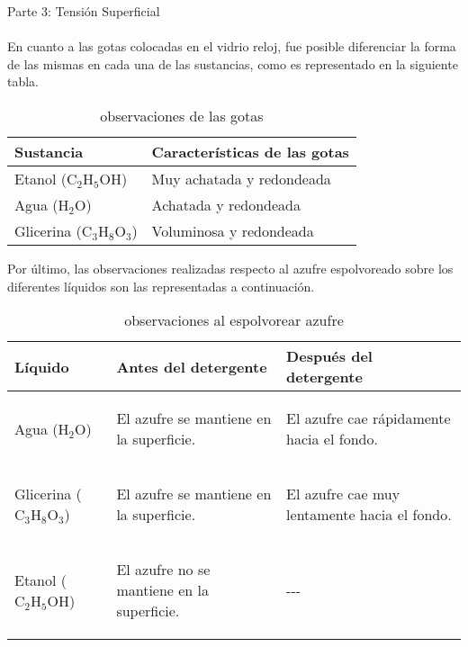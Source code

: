 \documentclass{article}
\begin{document}
Parte 3: Tensión Superficial
\\
\\
En cuanto a las gotas colocadas en el vidrio reloj, fue posible diferenciar la forma de las mismas en cada una de las sustancias, como es representado en la siguiente tabla.
\begin{table}[H]
\centering
\begin{tabular}{|m{4.5cm}|m{7.1cm}|}
\hline
\rowcolor[HTML]{C0C0C0} 
Sustancia & Características de las gotas \\ \hline
Etanol ($\text{C}_{\text{2}}\text{H}_{\text{5}}\text{OH}$) & Muy achatada y redondeada \\ \hline
Agua ($\text{H}_{\text{2}}\text{O}$) & Achatada y redondeada \\ \hline
Glicerina ($\text{C}_{\text{3}}\text{H}_{\text{8}}\text{O}_{\text{3}}$) & Voluminosa y redondeada \\ \hline
\end{tabular}
\caption{observaciones de las gotas}
\label{gota}
\end{table}
\newpage
Por último, las observaciones realizadas respecto al azufre espolvoreado sobre los diferentes líquidos son las representadas a continuación.

\begin{table}[H]
\centering
\begin{tabular}{|m{3.4cm}|m{3.9cm}|m{3.9cm}|}
\hline
\rowcolor[HTML]{C0C0C0} 
Líquido & Antes del detergente & Después del detergente \\ \hline
Agua ($\text{H}_{\text{2}}\text{O}$) & El azufre se mantiene en la superficie. & \begin{flushleft}El azufre cae rápidamente hacia el fondo.\end{flushleft} \\ \hline
Glicerina ($\text{C}_{\text{3}}\text{H}_{\text{8}}\text{O}_{\text{3}}$) & El azufre se mantiene en la superficie. & \begin{flushleft}El azufre cae muy lentamente hacia el fondo.\end{flushleft}\\ \hline
Etanol ($\text{C}_{\text{2}}\text{H}_{\text{5}}\text{OH}$) & \begin{flushleft}El azufre no se mantiene en la superficie.\end{flushleft} & \begin{center}{-}{-}{-}\end{center} \\ \hline
\end{tabular}
\caption{observaciones al espolvorear azufre}
\label{azufre}
\end{table}
\end{document}
